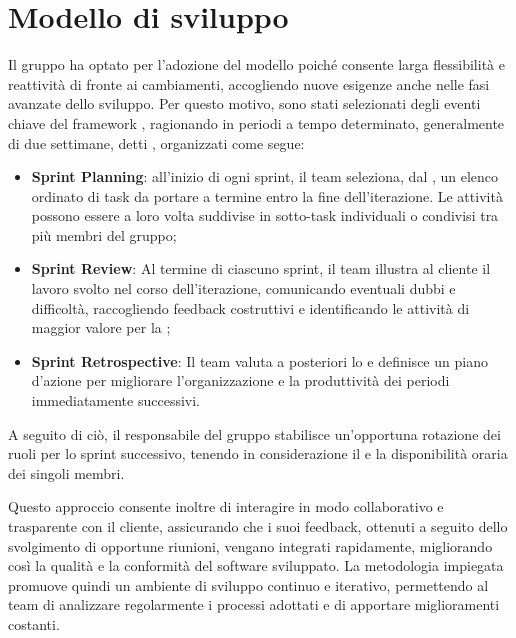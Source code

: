 \section{Modello di sviluppo}
\label{sec:modello_sviluppo}

Il gruppo ha optato per l'adozione del modello  poiché consente larga flessibilità e reattività di fronte ai cambiamenti, accogliendo nuove esigenze anche nelle fasi avanzate dello sviluppo. Per questo motivo, sono stati selezionati degli eventi chiave del framework , ragionando in periodi a tempo determinato, generalmente di due settimane, detti , organizzati come segue:
\begin{itemize}
\item \textbf{Sprint Planning}: all'inizio di ogni sprint, il team seleziona, dal , un elenco ordinato di task da portare a termine entro la fine dell'iterazione. Le attività possono essere a loro volta suddivise in sotto-task individuali o condivisi tra più membri del gruppo;
\item \textbf{Sprint Review}: Al termine di ciascuno sprint, il team illustra al cliente il lavoro svolto nel corso dell'iterazione, comunicando eventuali dubbi e difficoltà, raccogliendo feedback costruttivi e identificando le attività di maggior valore per la ;
\item \textbf{Sprint Retrospective}: Il team valuta a posteriori lo  e definisce un piano d'azione per migliorare l'organizzazione e la produttività dei periodi immediatamente successivi.
\end{itemize}
A seguito di ciò, il responsabile del gruppo stabilisce un'opportuna rotazione dei ruoli per lo sprint successivo, tenendo in considerazione il  e la disponibilità oraria dei singoli membri.

Questo approccio consente inoltre di interagire in modo collaborativo e trasparente con il cliente, assicurando che i suoi feedback, ottenuti a seguito dello svolgimento di opportune riunioni, vengano integrati rapidamente, migliorando così la qualità e la conformità del software sviluppato.
La metodologia impiegata promuove quindi un ambiente di sviluppo continuo e iterativo, permettendo al team di analizzare regolarmente i processi adottati e di apportare miglioramenti costanti.
